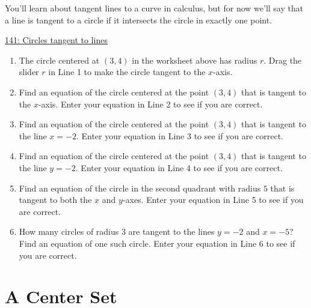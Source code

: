 \documentclass{ximera}
\begin{document}
\begin{question} \label{Qdf93r1000}

You'll learn about tangent lines to a curve in calculus, but for now we'll say that a line is tangent to a circle if it intersects the circle in exactly one point.


\begin{onlineOnly}
    \begin{center}
\end{center}
\end{onlineOnly}

\href{https://www.desmos.com/calculator/aosglrotza}{141: Circles tangent to lines}

\begin{enumerate}

\item The circle centered at $(3,4)$ in the worksheet above has radius $r$. Drag the slider $r$ in Line 1 to make the circle tangent to the $x$-axis. 

\item Find an equation of the circle centered at the point $(3,4)$ that is tangent to the $x$-axis. Enter your equation in Line 2 to see if you are correct.

\item Find an equation of the circle centered at the point $(3,4)$ that is tangent to the line $x=-2$. Enter your equation in Line 3 to see if you are correct.

\item Find an equation of the circle centered at the point $(3,4)$ that is tangent to the line $y=-2$. Enter your equation in Line 4 to see if you are correct.

\item Find an equation of the circle in the second quadrant with radius $5$ that is tangent to both the $x$ and $y$-axes. Enter your equation in Line 5 to see if you are correct.

\item How many circles of radius $3$ are tangent to the lines $y=-2$ and $x=-5$? Find an equation of one such circle. Enter your equation in Line 6 to see if you are correct.

\end{enumerate}

\end{question}


\section{A Center Set}
\end{document}
